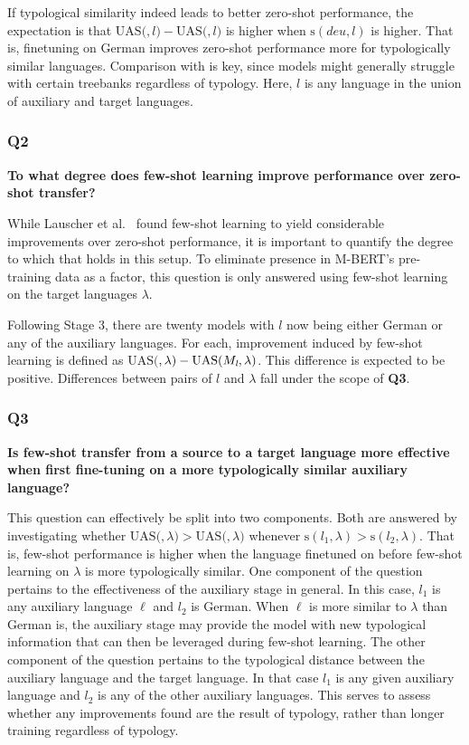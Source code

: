 			If typological similarity indeed leads to better zero-shot performance, the expectation is that $\text{UAS}($\mde$, l) - \text{UAS}($\mbase$, l)$ is higher when $\text{s}(\textit{deu}, l)$ is higher. That is, finetuning on German improves zero-shot performance more for typologically similar languages. Comparison with \mbase is key, since models might generally struggle with certain treebanks regardless of typology. Here, $l$ is any language in the union of auxiliary and target languages.

		\subsubsection{Q2}
		\textbf{To what degree does few-shot learning improve performance over zero-shot transfer?}
		
			While Lauscher et al.~\cite{lauscher-etal-2020-zero} found few-shot learning to yield considerable improvements over zero-shot performance, it is important to quantify the degree to which that holds in this setup. To eliminate presence in M-BERT's pre-training data as a factor, this question is only answered using few-shot learning on the target languages $\lambda$. 

			Following Stage 3, there are twenty models  with $l$ now being either German or any of the auxiliary languages. For each, improvement induced by few-shot learning is defined as $\text{UAS}($$, \lambda) - \text{UAS}(M_{\textit{\scriptsize l}}, \lambda)$. This difference is expected to be positive. Differences between pairs of $l$ and $\lambda$ fall under the scope of \textbf{Q3}.

		\subsubsection{Q3}
		\textbf{Is few-shot transfer from a source to a target language more effective when first fine-tuning on a more typologically similar auxiliary language?}

			This question can effectively be split into two components. Both are answered by investigating whether $\text{UAS}($$, \lambda) > \text{UAS}($$, \lambda)$ whenever $\text{s}(l_1, \lambda) > \text{s}(l_2, \lambda)$. That is, few-shot performance is higher when the language finetuned on before few-shot learning on $\lambda$ is more typologically similar. One component of the question pertains to the effectiveness of the auxiliary stage in general. In this case, $l_1$ is any auxiliary language $\ell$ and $l_2$ is German. When $\ell$ is more similar to $\lambda$ than German is, the auxiliary stage may provide the model with new typological information that can then be leveraged during few-shot learning. The other component of the question pertains to the typological distance between the auxiliary language and the target language. In that case $l_1$ is any given auxiliary language and $l_2$ is any of the other auxiliary languages. This serves to assess whether any improvements found are the result of typology, rather than longer training regardless of typology.
		

